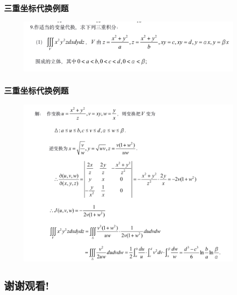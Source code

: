 \documentclass[xetex]{beamer}
\begin{document}
\begin{frame}
    \frametitle{三重坐标代换例题}
    \begin{figure}[ht]
        \centering %
       \includegraphics[width=1.0\textwidth]{img/e.jpg}
    \end{figure}
\end{frame} 

\begin{frame}
    \frametitle{三重坐标代换例题}
    \begin{figure}[ht]
        \centering %
       \includegraphics[width=1.0\textwidth]{img/f.jpg}
    \end{figure}
\end{frame} 

\begin{frame}
    \section{谢谢观看!}
\end{frame} 
\end{document}
